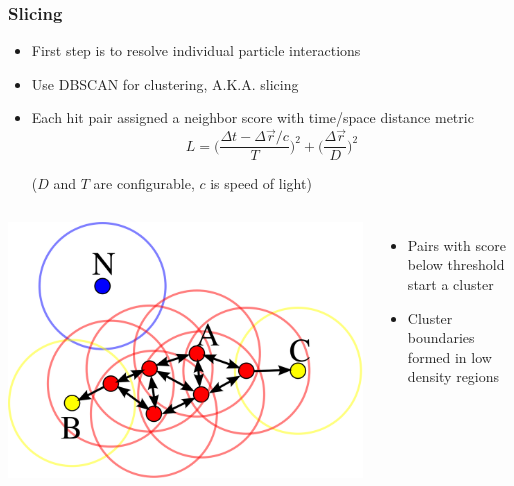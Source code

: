 \documentclass[10pt,professionalfonts,xcolor=table]{beamer}
\begin{document}
\begin{frame}

\frametitle{Slicing}

\begin{itemize}
\item First step is to resolve individual particle interactions
\gap
\item Use DBSCAN for clustering, A.K.A. slicing
\gap
\item Each hit pair assigned a neighbor score with time/space distance metric
\begin{equation*}
L = \bigg( \frac{\Delta t - \Delta \vec{r} / c }{T} \bigg)^2 +
     \bigg( \frac{\Delta \vec{r}}{D} \bigg)^2
\end{equation*}
\begin{center}
 ($D$ and $T$ are configurable, $c$ is speed of light)
\end{center}
\end{itemize}

\begin{columns}[c]

\centering

\includegraphics[width=\textwidth]{figures/figures/dbscan.png}

\begin{itemize}
\gap
\item Pairs with score below threshold start a cluster
\gap
\item Cluster boundaries formed in low density regions

\end{itemize}

\end{columns}

\end{frame}
\end{document}
